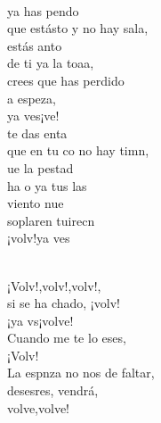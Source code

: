 \begin{cancion}%
	  \\
	ya has pendo\\
	que estásto y no hay sala,\\
	estás anto \\
	de ti ya la toaa,\\
	crees que  has perdido\\
	a  espeza,\\
	ya ves¡ve! \\
\jump
	te das enta\\
	que en tu co no hay timn,\\
	ue la pestad \\
	ha o ya tus las\\
	viento nue \\
	soplaren tuirecn \\
	¡volv!ya ves\\\jump\\
	\begin{chorus}%
	¡Volv!,volv!,volv!,     \\
	si se ha chado, ¡volv!\\
	¡ya vs¡volve!\\
	Cuando me te lo eses,\\
	¡Volv!\\
\jump
	La espnza no nos  de faltar,\\
	desesres, vendrá,\\
	volve,volve!\\

\end{chorus}
\end{cancion}
